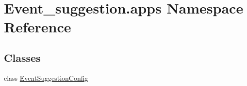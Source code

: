 \hypertarget{namespaceEvent__suggestion_1_1apps}{}\section{Event\+\_\+suggestion.\+apps Namespace Reference}
\label{namespaceEvent__suggestion_1_1apps}
\subsection*{Classes}
\begin{DoxyCompactItemize}
\item 
class \hyperlink{classEvent__suggestion_1_1apps_1_1EventSuggestionConfig}{Event\+Suggestion\+Config}
\end{DoxyCompactItemize}
